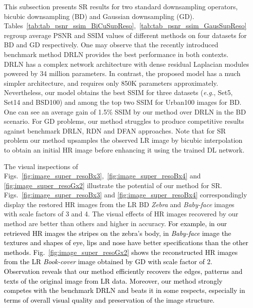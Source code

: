 \documentclass[10pt,journal,compsoc]{IEEEtran}
\newcommand{\sd}{\textcolor{black}}
\begin{document}
This subsection presents SR results for two standard downsampling operators, bicubic downsampling (BD) and Gaussian downsampling (GD). Tables~\ref{tab:tab_psnr_ssim_BiCuSupReso},~\ref{tab:tab_psnr_ssim_GausSupReso} regroup average PSNR and SSIM values of different methods on four datasets for BD and GD respectively. One may observe that the recently introduced benchmark method DRLN \cite{Anwar2022densely} provides the best performance in both contexts. DRLN has a complex network architecture with dense residual Laplacian modules powered by 34 million parameters. In contrast, the proposed model has a much simpler architecture, and requires only 850K parameters approximately. Nevertheless, our model obtains the best SSIM for three datasets (\textit{e.g.}, Set5, Set14 and BSD100) and among the top two SSIM for Urban100 images for BD. One can see an average gain of 1.5\% SSIM by our method over DRLN in the BD scenario. For GD problems, our method struggles to produce competitive results against benchmark DRLN, RDN and DFAN approaches. Note that for SR problem our method upsamples the observed LR image by bicubic interpolation to obtain an initial HR image before enhancing it using the trained DL network.




The visual inspections of Figs.~\ref{fig:image_super_resoBx3},~\ref{fig:image_super_resoBx4} and \ref{fig:image_super_resoGx2} illustrate the potential of our method for SR. Figs.~\ref{fig:image_super_resoBx3} and \ref{fig:image_super_resoBx4} correspondingly display the restored HR images from the LR BD \textit{Zebra} and \textit{Baby-face} images with scale factors of 3 and 4. The visual effects of HR images recovered by our method are better than others and higher in accuracy.
\sd{For example, in our retrieved HR images the stripes on the zebra's body, in \textit{Baby-face} image the textures and shapes of eye, lips and nose have better specifications than the other methods.
Fig.~\ref{fig:image_super_resoGx2} shows the reconstructed HR images from the LR \textit{Book-cover} image obtained by GD with scale factor of 2. Observation reveals that our method efficiently recovers the edges, patterns and texts of the original image from LR data. Moreover, our method strongly competes with the benchmark DRLN and beats it in some respects, especially in terms of overall visual quality and preservation of the image structure.}
\end{document}
